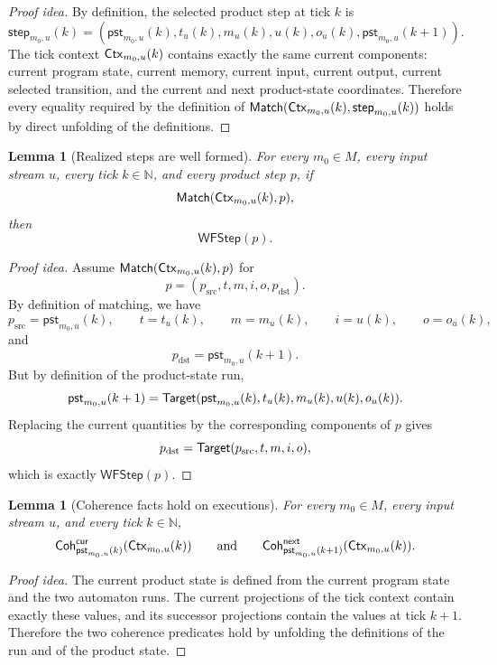 \documentclass[acmsmall,screen]{acmart}
\theoremstyle{leftplain}
\newtheorem{lemma}[theorem]{Lemma}
\theoremstyle{leftdefinition}
\theoremstyle{leftremark}
\begin{document}
\begin{proof}[Proof idea]
By definition, the selected product step at tick $k$ is
\[
  \mathsf{step}_{m_0,u}(k)=
  (\mathsf{pst}_{m_0,u}(k), t_u(k), m_u(k), u(k), o_u(k), \mathsf{pst}_{m_0,u}(k+1)).
\]
The tick context $\mathsf{Ctx}_{m_0,u}(k)$ contains exactly the same current
components: current program state, current memory, current input, current
output, current selected transition, and the current and next product-state
coordinates. Therefore every equality required by the definition of
$\mathsf{Match}(\mathsf{Ctx}_{m_0,u}(k),\mathsf{step}_{m_0,u}(k))$ holds by direct unfolding of
the definitions.
\end{proof}

\begin{lemma}[Realized steps are well formed]
\label{lem:realized-wf}
For every $m_0 \in M$, every input stream $u$, every tick $k \in \mathbb{N}$,
and every product step $p$, if
\[
  \mathsf{Match}(\mathsf{Ctx}_{m_0,u}(k),p),
\]
then
\[
  \mathsf{WFStep}(p).
\]
\end{lemma}

\begin{proof}[Proof idea]
Assume $\mathsf{Match}(\mathsf{Ctx}_{m_0,u}(k),p)$ for
\[
  p=(p_{\mathrm{src}}, t, m, i, o, p_{\mathrm{dst}}).
\]
By definition of matching, we have
\[
  p_{\mathrm{src}}=\mathsf{pst}_{m_0,u}(k),\qquad
  t=t_u(k),\qquad
  m=m_u(k),\qquad
  i=u(k),\qquad
  o=o_u(k),
\]
and
\[
  p_{\mathrm{dst}}=\mathsf{pst}_{m_0,u}(k+1).
\]
But by definition of the product-state run,
\[
  \mathsf{pst}_{m_0,u}(k+1)=
  \mathsf{Target}(\mathsf{pst}_{m_0,u}(k), t_u(k), m_u(k), u(k), o_u(k)).
\]
Replacing the current quantities by the corresponding components of $p$ gives
\[
  p_{\mathrm{dst}}=\mathsf{Target}(p_{\mathrm{src}},t,m,i,o),
\]
which is exactly $\mathsf{WFStep}(p)$.
\end{proof}

\begin{lemma}[Coherence facts hold on executions]
\label{lem:coherence}
For every $m_0 \in M$, every input stream $u$, and every tick
$k \in \mathbb{N}$,
\[
  \mathsf{Coh}^{\mathsf{cur}}_{\mathsf{pst}_{m_0,u}(k)}(\mathsf{Ctx}_{m_0,u}(k))
  \qquad\text{and}\qquad
  \mathsf{Coh}^{\mathsf{next}}_{\mathsf{pst}_{m_0,u}(k+1)}(\mathsf{Ctx}_{m_0,u}(k)).
\]
\end{lemma}

\begin{proof}[Proof idea]
The current product state is defined from the current program state and the two
automaton runs. The current projections of the tick context contain exactly
these values, and its successor projections contain the values at tick $k+1$.
Therefore the two coherence predicates hold by unfolding the definitions of the
run and of the product state.
\end{proof}
\end{document}
